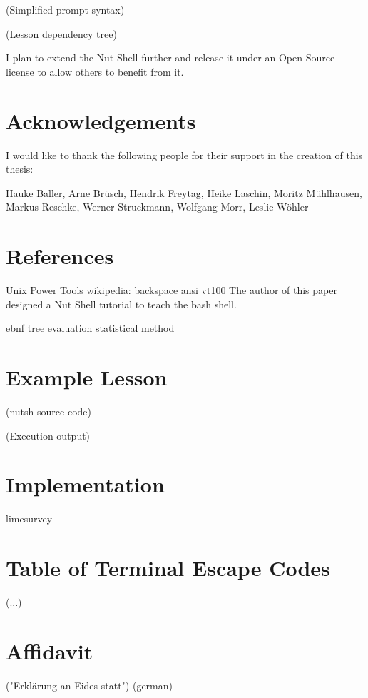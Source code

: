 \documentclass[twoside]{scrreprt}
\begin{document}
    (Simplified prompt syntax)

    (Lesson dependency tree)

I plan to extend the Nut Shell further and release it under an Open Source license to allow others to benefit from it.

\chapter*{Acknowledgements}

I would like to thank the following people for their support in the creation of this thesis:

Hauke Baller,
Arne Brüsch,
Hendrik Freytag,
Heike Laschin,
Moritz Mühlhausen,
Markus Reschke,
Werner Struckmann,
Wolfgang Morr,
Leslie Wöhler

\chapter{References}

Unix Power Tools
wikipedia: backspace
ansi
vt100
The author of this paper designed a Nut Shell tutorial to teach the bash shell.

ebnf
tree evaluation
statistical method

\appendix

\chapter{Example Lesson}

(nutsh source code)

(Execution output)

\chapter{Implementation}

    limesurvey

\chapter{Table of Terminal Escape Codes}

(...)

\chapter*{Affidavit}

("Erklärung an Eides statt")
\vspace{8em}
(german)
\end{document}
